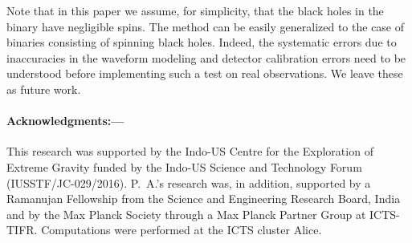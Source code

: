 \documentclass[prl,preprintnumbers,twocolumn,eqsecnum,floatfix,a4paper,nofootinbib,superscriptaddress]{revtex4}
\begin{document}
Note that in this paper we assume, for simplicity, that the black holes in the binary have negligible spins. The method can be easily generalized to the case of binaries consisting of spinning black holes. Indeed, the systematic errors due to inaccuracies in the waveform modeling and detector calibration errors need to be understood before implementing such a test on real observations. We leave these as future work. 

\paragraph{Acknowledgments:---}
This research was supported by the Indo-US Centre for the Exploration of Extreme Gravity funded by the Indo-US Science and Technology Forum (IUSSTF/JC-029/2016). P.~A.'s research was, in addition, supported by a Ramanujan Fellowship from the Science and Engineering Research Board, India and by the Max Planck Society through a Max Planck Partner Group at ICTS-TIFR. Computations were performed at the ICTS cluster Alice. 
%


\end{document}
